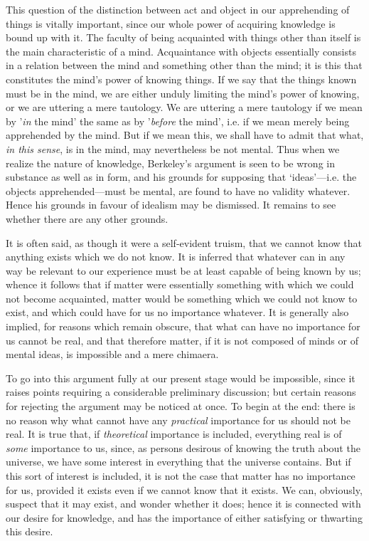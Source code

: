 \documentclass[oneside,letterpaper,12pt]{book}
\begin{document}
This question of the distinction between act and object in our
apprehending of things is vitally important, since our whole power of
acquiring knowledge is bound up with it. The faculty of being acquainted
with things other than itself is the main characteristic of a mind.
Acquaintance with objects essentially consists in a relation between the
mind and something other than the mind; it is this that constitutes the
mind's power of knowing things. If we say that the
things known must be in the mind, we are either unduly limiting the
mind's power of knowing, or we are uttering a mere
tautology. We are uttering a mere tautology if we mean by
'\emph{in} the mind' the same as by
'\emph{before} the mind', i.e. if we
mean merely being apprehended by the mind. But if we mean this, we shall
have to admit that what, \emph{in this sense}, is in the mind, may
nevertheless be not mental. Thus when we realize the nature of
knowledge, Berkeley's argument is seen to be wrong in
substance as well as in form, and his grounds for supposing that
`ideas'---i.e. the objects
apprehended---must be mental, are found to have no validity whatever.
Hence his grounds in favour of idealism may be dismissed. It remains to
see whether there are any other grounds.

It is often said, as though it were a self-evident truism, that we
cannot know that anything exists which we do not know. It is inferred
that whatever can in any way be relevant to our experience must be at
least capable of being known by us; whence it follows that if matter
were essentially something with which we could not become acquainted,
matter would be something which we could not know to exist, and which
could have for us no importance whatever. It is generally also implied,
for reasons which remain obscure, that what can have no importance for
us cannot be real, and that therefore matter, if it is not composed of
minds or of mental ideas, is impossible and a mere chimaera.

To go into this argument fully at our present stage would be impossible,
since it raises points requiring a considerable preliminary discussion;
but certain reasons for rejecting the argument may be noticed at once.
To begin at the end: there is no reason why what cannot have any
\emph{practical} importance for us should not be real. It is true that,
if \emph{theoretical} importance is included, everything real is of
\emph{some} importance to us, since, as persons desirous of knowing the
truth about the universe, we have some interest in everything that the
universe contains. But if this sort of interest is included, it is not
the case that matter has no importance for us, provided it exists even
if we cannot know that it exists. We can, obviously, suspect that it may
exist, and wonder whether it does; hence it is connected with our desire
for knowledge, and has the importance of either satisfying or thwarting
this desire.
\end{document}
